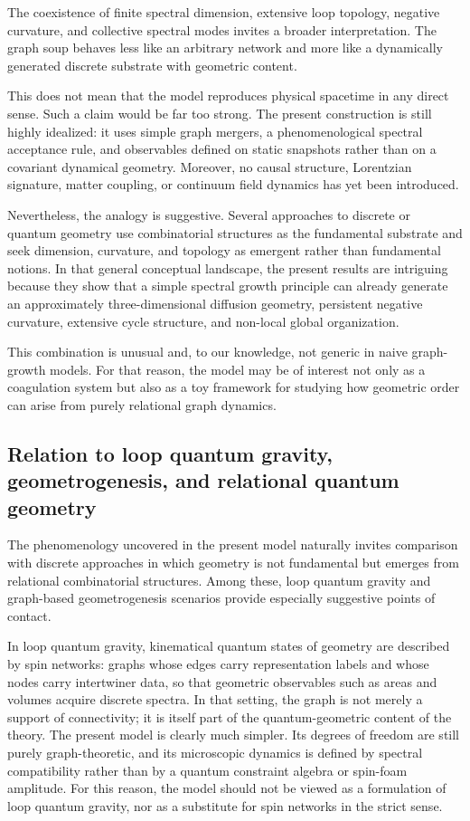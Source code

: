 \documentclass[11pt]{article}
\begin{document}
The coexistence of finite spectral dimension, extensive loop topology, negative curvature, and collective spectral modes invites a broader interpretation.
The graph soup behaves less like an arbitrary network and more like a dynamically generated discrete substrate with geometric content.

This does not mean that the model reproduces physical spacetime in any direct sense.
Such a claim would be far too strong.
The present construction is still highly idealized:
it uses simple graph mergers, a phenomenological spectral acceptance rule, and observables defined on static snapshots rather than on a covariant dynamical geometry.
Moreover, no causal structure, Lorentzian signature, matter coupling, or continuum field dynamics has yet been introduced.

Nevertheless, the analogy is suggestive.
Several approaches to discrete or quantum geometry use combinatorial structures as the fundamental substrate and seek dimension, curvature, and topology as emergent rather than fundamental notions.
In that general conceptual landscape, the present results are intriguing because they show that a simple spectral growth principle can already generate an approximately three-dimensional diffusion geometry, persistent negative curvature, extensive cycle structure, and non-local global organization.

This combination is unusual and, to our knowledge, not generic in naive graph-growth models.
For that reason, the model may be of interest not only as a coagulation system but also as a toy framework for studying how geometric order can arise from purely relational graph dynamics.

\subsection{Relation to loop quantum gravity, geometrogenesis, and relational quantum geometry}
\label{sec:lqg_connection}

The phenomenology uncovered in the present model naturally invites comparison with discrete approaches in which geometry is not fundamental but emerges from relational combinatorial structures.
Among these, loop quantum gravity and graph-based geometrogenesis scenarios provide especially suggestive points of contact.

In loop quantum gravity, kinematical quantum states of geometry are described by spin networks:
graphs whose edges carry representation labels and whose nodes carry intertwiner data, so that geometric observables such as areas and volumes acquire discrete spectra.
In that setting, the graph is not merely a support of connectivity; it is itself part of the quantum-geometric content of the theory.
The present model is clearly much simpler.
Its degrees of freedom are still purely graph-theoretic, and its microscopic dynamics is defined by spectral compatibility rather than by a quantum constraint algebra or spin-foam amplitude.
For this reason, the model should not be viewed as a formulation of loop quantum gravity, nor as a substitute for spin networks in the strict sense.
\end{document}
